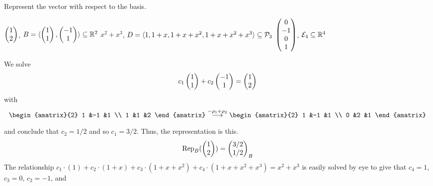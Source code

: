 \begin{exercises}
\begin{answer}
\begin{exparts}
      \end{exparts}  
     \end{answer}
  \recommended \item 
    Represent the vector with respect to the basis.
    \begin{exparts}
      \partsitem \( \colvec{1 \\ 2} \),
        \( B=\sequence{\colvec{1 \\ 1},\colvec{-1 \\ 1}}\subseteq\Re^2 \)
      \partsitem \( x^2+x^3 \),
        \( D=\sequence{1,1+x,1+x+x^2,1+x+x^2+x^3}\subseteq\polyspace_3 \)
      \partsitem \( \colvec{0 \\ -1 \\ 0 \\ 1} \),
        \( \stdbasis_4\subseteq\Re^4 \)
    \end{exparts}
    \begin{answer}  
      \begin{exparts}
        \partsitem We solve
          \begin{equation*}
            c_1\colvec{1 \\ 1}
            +c_2\colvec{-1 \\ 1}
            =\colvec{1 \\ 2}
          \end{equation*}
          with
          \begin{equation*}
             \begin{amatrix}{2}
               1  &-1  &1  \\
               1  &1   &2
             \end{amatrix}
             \grstep{-\rho_1+\rho_2}
             \begin{amatrix}{2}
               1  &-1  &1  \\
               0  &2   &1
             \end{amatrix}
          \end{equation*}
          and conclude that \( c_2=1/2 \) and so \( c_1=3/2 \).
          Thus, the representation is this.
          \begin{equation*}
            \rep{\colvec{1 \\ 2}}{B}=\colvec{3/2 \\ 1/2}_B
          \end{equation*}
        \partsitem The relationship
           $c_1\cdot(1)+c_2\cdot(1+x)+c_3\cdot(1+x+x^2)+c_4\cdot(1+x+x^2+x^3)
             =x^2+x^3$
           is easily solved by eye to give that $c_4=1$, $c_3=0$, $c_2=-1$, and

\end{exparts}
\end{answer}
\end{exercises}
